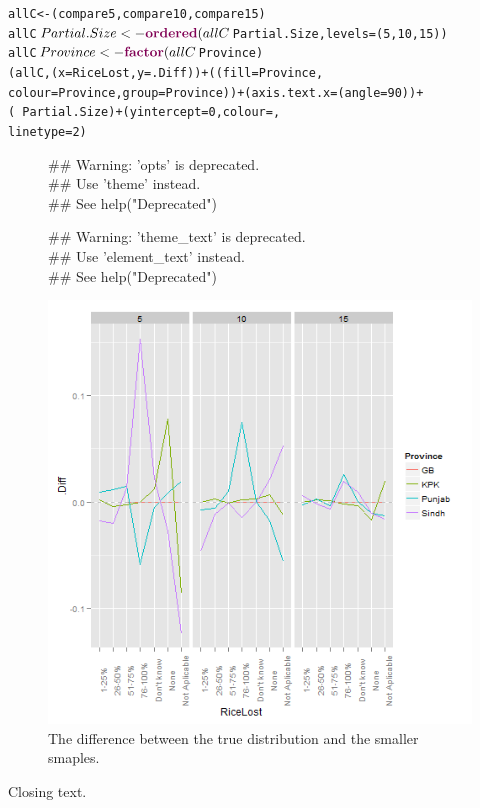 \begin{knitrout}
\color{fgcolor}\begin{kframe}
\begin{alltt}
allC <- (compare5, compare10, compare15)
allC$Partial.Size <- \hlfunctioncall{ordered}(allC$Partial.Size, levels = (5, 10, 15))
allC$Province <- \hlfunctioncall{factor}(allC$Province)
(allC, (x = RiceLost, y = .Diff)) + ((fill = Province, 
    colour = Province, group = Province)) + (axis.text.x = (angle = 90)) + 
    (~Partial.Size) + (yintercept = 0, colour = , 
    linetype = 2)
\end{alltt}
\end{kframe}
\end{knitrout}


\begin{figure}[!hbtp]
\begin{knitrout}
\color{fgcolor}\begin{kframe}


{\ttfamily\noindent\textcolor{warningcolor}{\#\# Warning: 'opts' is deprecated.\\\#\# Use 'theme' instead.\\\#\# See help("Deprecated")}}

{\ttfamily\noindent\textcolor{warningcolor}{\#\# Warning: 'theme\_text' is deprecated.\\\#\# Use 'element\_text' instead.\\\#\# See help("Deprecated")}}\end{kframe}\includegraphics[width=.9\linewidth]{smallerDist/figures/distErrorsPlot} 
\end{knitrout}

\caption[Distribution Differences.]{The difference between the true distribution and the smaller smaples.\label{fig:distErrors}}
\end{figure}

Closing text.
